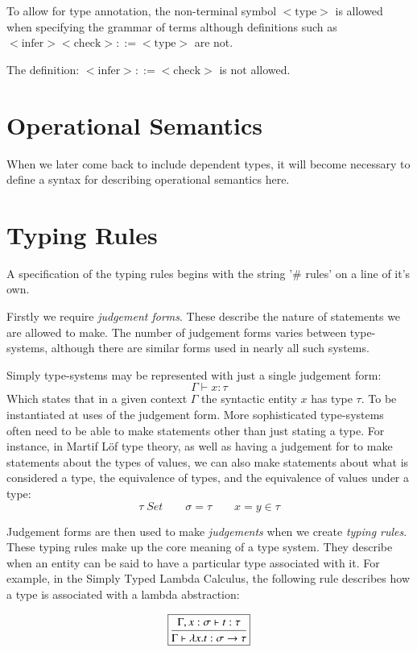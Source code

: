 To allow for type annotation, the non-terminal symbol $<\mbox{type}>$
is allowed when specifying the grammar of terms although definitions
such as $<\mbox{infer}> <\mbox{check}> ::= <\mbox{type}>$ are not.

The definition: $<\mbox{infer}> ::= <\mbox{check}>$ is not allowed.

\section{Operational Semantics}

When we later come back to include dependent types, it will become
necessary to define a syntax for describing operational semantics here.

\section{Typing Rules}

A specification of the typing rules begins with the string '\# rules'
on a line of it's own.

Firstly we require \emph{judgement forms}. These describe the nature
of statements we are allowed to make. The number of judgement forms
varies between type-systems, although there are similar forms used in
nearly all such systems.

Simply type-systems may be represented with just a single judgement
form:
$$\boxed{\Gamma \vdash x : \tau}$$
Which states that in a given context $\Gamma$ the syntactic entity
$x$ has type $\tau$. To be instantiated at uses of the judgement form.
More sophisticated type-systems often need to be able to make
statements other than just stating a type. For instance, in Martif
L\"of type theory, as well as having a judgement for to make
statements about the types of values, we can also make statements
about what is considered a type, the equivalence of types, and the
equivalence of values under a type:
$$\boxed{\tau \; Set} \qquad \boxed{\sigma = \tau} \qquad \boxed{x = y
  \in \tau}$$

Judgement forms are then used to make \emph{judgements} when we create
\emph{typing rules}. These typing rules make up the core meaning of a
type system. They describe when an entity can be said to have a
particular type associated with it. For example, in the Simply Typed
Lambda Calculus, the following rule describes how a type is associated
with a lambda abstraction:

$$\boxed{
\mbox{\begin {prooftree}
  \hypo{\Gamma , x : \sigma \vdash t : \tau}
  \infer1[]{\Gamma \vdash \lambda x . t : \sigma \to \tau}
\end {prooftree}}
}$$


